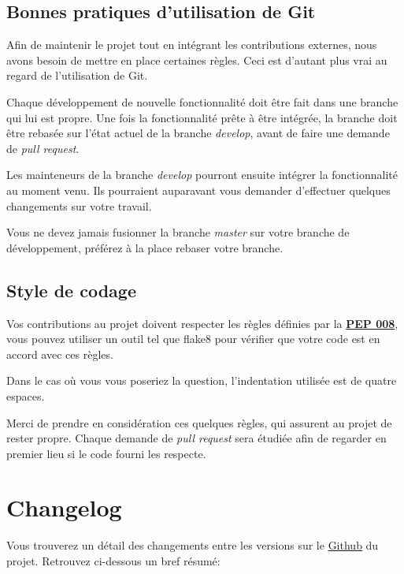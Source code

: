 \documentclass[letterpaper,10pt,english]{sphinxmanual}
\begin{document}
\subsection{Bonnes pratiques d'utilisation de Git}
\label{contribute:good-practices-with-git}
Afin de maintenir le projet tout en intégrant les contributions externes, nous avons besoin de mettre en place certaines règles. Ceci est d'autant plus vrai au regard de l'utilisation de Git.

Chaque développement de nouvelle fonctionnalité doit être fait dans une branche qui lui est propre. Une fois la fonctionnalité prête à être intégrée, la branche doit être rebasée sur l'état actuel de la branche \emph{develop}, avant de faire une demande de \emph{pull request}.

Les mainteneurs de la branche \emph{develop} pourront ensuite intégrer la fonctionnalité au moment venu. Ils pourraient auparavant vous demander d'effectuer quelques changements sur votre travail.

Vous ne devez jamais fusionner la branche \emph{master} sur votre branche de développement, préférez à la place rebaser votre branche.


\subsection{Style de codage}
\label{contribute:coding-style}
Vos contributions au projet doivent respecter les règles définies par la \href{http://www.python.org/dev/peps/pep-0008}{\textbf{PEP 008}}, vous pouvez utiliser un outil tel que flake8 pour vérifier que votre code est en accord avec ces règles.

Dans le cas où vous vous poseriez la question, l'indentation utilisée est de quatre espaces.

Merci de prendre en considération ces quelques règles, qui assurent au projet de rester propre. Chaque demande de \emph{pull request} sera étudiée afin de regarder en premier lieu si le code fourni les respecte.


\section{Changelog}
\label{changelog::doc}\label{changelog:changelog}
Vous trouverez un détail des changements entre les versions sur le \href{https://github.com/onitu/onitu/releases}{Github} du projet. Retrouvez ci-dessous un bref résumé:
\end{document}
